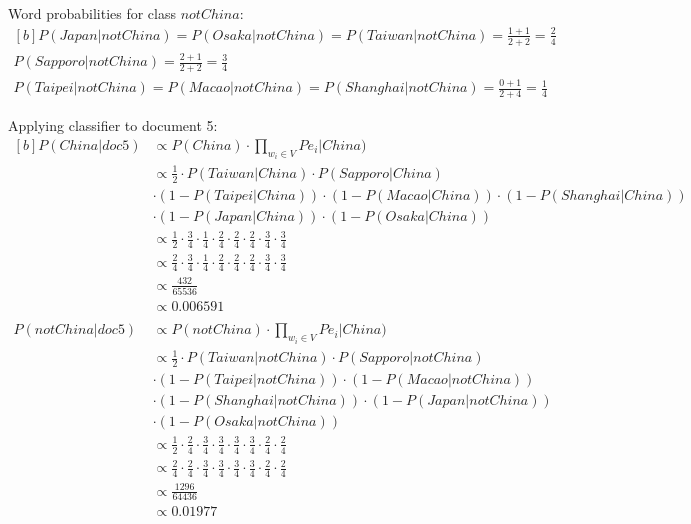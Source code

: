 \documentclass{article}
\begin{document}
Word probabilities for class $notChina$:
\begin{equation}
\begin{aligned}[b]
P(Japan|notChina) = P(Osaka|notChina) = P(Taiwan|notChina) = \frac{1 + 1}{2 + 2} = \frac{2}{4} \\
P(Sapporo|notChina) = \frac{2 + 1}{2 + 2} = \frac{3}{4} \\
P(Taipei|notChina) = P(Macao|notChina) = P(Shanghai|notChina) = \frac{0 + 1}{2 + 4} = \frac{1}{4}
\end{aligned}
\end{equation}

Applying classifier to document 5:
\begin{equation}
\begin{aligned}[b]
	P(China|doc5) & \propto P(China) \cdot \prod_{w_i \in V} {Pe_i|China)} \\
	& \propto \frac{1}{2} \cdot P(Taiwan|China) \cdot P(Sapporo|China) \nonumber \\
	& \cdot (1 - P(Taipei|China)) \cdot (1 - P(Macao|China)) \cdot (1 - P(Shanghai|China)) \nonumber \\
	& \cdot (1 - P(Japan|China)) \cdot (1 - P(Osaka|China)) \\
	& \propto \frac{1}{2} \cdot \frac{3}{4} \cdot \frac{1}{4}
	\cdot \frac{2}{4} \cdot \frac{2}{4} \cdot \frac{2}{4}
	\cdot \frac{3}{4} \cdot \frac{3}{4} \\
	& \propto \frac{2}{4} \cdot \frac{3}{4} \cdot \frac{1}{4}
	\cdot \frac{2}{4} \cdot \frac{2}{4} \cdot \frac{2}{4}
	\cdot \frac{3}{4} \cdot \frac{3}{4} \\
	& \propto \frac{432}{65536} \\
	& \propto 0.006591 \\
	& \nonumber \\
	P(notChina|doc5) & \propto P(notChina) \cdot \prod_{w_i \in V} {Pe_i|China)} \\
	& \propto \frac{1}{2} \cdot P(Taiwan|notChina) \cdot P(Sapporo|notChina) \nonumber \\
	& \cdot (1 - P(Taipei|notChina)) \cdot (1 - P(Macao|notChina)) \nonumber \\
	& \cdot (1 - P(Shanghai|notChina)) \cdot (1 - P(Japan|notChina)) \nonumber \\
	& \cdot (1 - P(Osaka|notChina)) \\	
	& \propto \frac{1}{2} \cdot \frac{2}{4} \cdot \frac{3}{4} \cdot \frac{3}{4} \cdot \frac{3}{4} \cdot \frac{3}{4} \cdot \frac{2}{4} \cdot \frac{2}{4} \\
	& \propto \frac{2}{4} \cdot \frac{2}{4} \cdot \frac{3}{4} \cdot \frac{3}{4} \cdot \frac{3}{4} \cdot \frac{3}{4} \cdot \frac{2}{4} \cdot \frac{2}{4} \\
	& \propto \frac{1296}{64436} \\
	& \propto0.01977
\end{aligned}
\end{equation}
\end{document}
